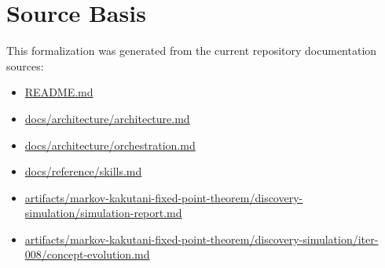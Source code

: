 \documentclass[11pt]{article}
\begin{document}
\section{Source Basis}
This formalization was generated from the current repository documentation sources:
\begin{itemize}[leftmargin=*,itemsep=0.2em]
\item \url{README.md}
\item \url{docs/architecture/architecture.md}
\item \url{docs/architecture/orchestration.md}
\item \url{docs/reference/skills.md}
\item \url{artifacts/markov-kakutani-fixed-point-theorem/discovery-simulation/simulation-report.md}
\item \url{artifacts/markov-kakutani-fixed-point-theorem/discovery-simulation/iter-008/concept-evolution.md}
\end{itemize}
\end{document}
